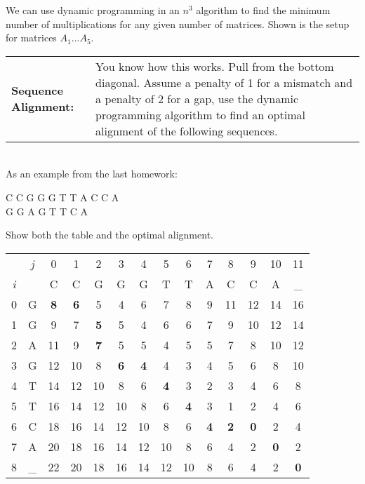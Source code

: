 \documentclass[aip, jmp, amsmath,amssymb, reprint]{revtex4-1}
\theoremstyle{definition}
\begin{document}
We can use dynamic programming in an $n^3$ algorithm to find the minimum number of multiplications for any given number of matrices. Shown is the setup for matrices $A_1$...$A_5$.
\begin{center}
\end{center}
\begin{tabular}{p{2cm} p{5cm} }
    \textbf{Sequence Alignment:} & You know how this works. Pull from the bottom diagonal. Assume a penalty of 1 for a mismatch and a penalty of 2 for a gap, use the dynamic programming algorithm to find an optimal alignment of the following sequences.
\end{tabular}\\
As an example from the last homework:\\
\begin{center}
    C C G G G T T A C C A\\
    G G A G T T C A
\end{center}
Show both the table and the optimal alignment.
\begin{center}
\begin{tabular}{|cc|c|c|c|c|c|c|c|c|c|c|c|c|}
    \hline
    & \textit{j} & 0 & 1 & 2 & 3 & 4 & 5 & 6 & 7 & 8 & 9 & 10 & 11\\
    \textit{i}& & C & C & G & G & G & T & T & A & C & C & A & \_\\
    \hline
    0 & G & \textbf{8} & \textbf{6} & 5 & 4 & 6 & 7 & 8 & 9 & 11 & 12 & 14 & 16\\
    \hline
    1 & G & 9 & 7 & \textbf{5} & 5 & 4 & 6 & 6 & 7 & 9 & 10 & 12 & 14\\
    \hline
    2 & A & 11 & 9 & \textbf{7} & 5 & 5 & 4 & 5 & 5 & 7 & 8 & 10 & 12\\
    \hline
    3 & G & 12 & 10 & 8 & \textbf{6} & \textbf{4} & 4 & 3 & 4 & 5 & 6 & 8 & 10\\
    \hline
    4 & T & 14 & 12 & 10 & 8 & 6 & \textbf{4} & 3 & 2 & 3 & 4 & 6 & 8\\
    \hline
    5 & T & 16 & 14 & 12 & 10 & 8 & 6 & \textbf{4} & 3 & 1 & 2 & 4 & 6\\
    \hline
    6 & C & 18 & 16 & 14 & 12 & 10 & 8 & 6 & \textbf{4} & \textbf{2} & \textbf{0} & 2 & 4\\
    \hline
    7 & A & 20 & 18 & 16 & 14 & 12 & 10 & 8 & 6 & 4 & 2 & \textbf{0} & 2\\
    \hline
    8 & \_ & 22 & 20 & 18 & 16 & 14 & 12 & 10 & 8 & 6 & 4 & 2 & \textbf{0}\\
    \hline
\end{tabular}
\end{center}
\end{document}
